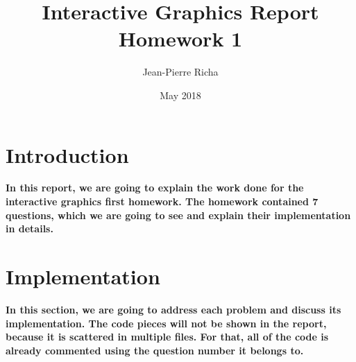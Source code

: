 \documentclass{article}
\begin{document}
\title{Interactive Graphics Report\\
		Homework 1}
\author{Jean-Pierre Richa}
\date{May 2018}
\maketitle
\section {Introduction}
\textbf {In this report, we are going to explain the work done for the interactive graphics first homework.
The homework contained 7 questions, which we are going to see and explain their implementation in details.}

\section {Implementation}
\textbf{In this section, we are going to address each problem and discuss its implementation. The code pieces will not be shown in the report, because it is scattered in multiple files. For that, all of the code is already commented using the question number it belongs to.}
\end{document}
